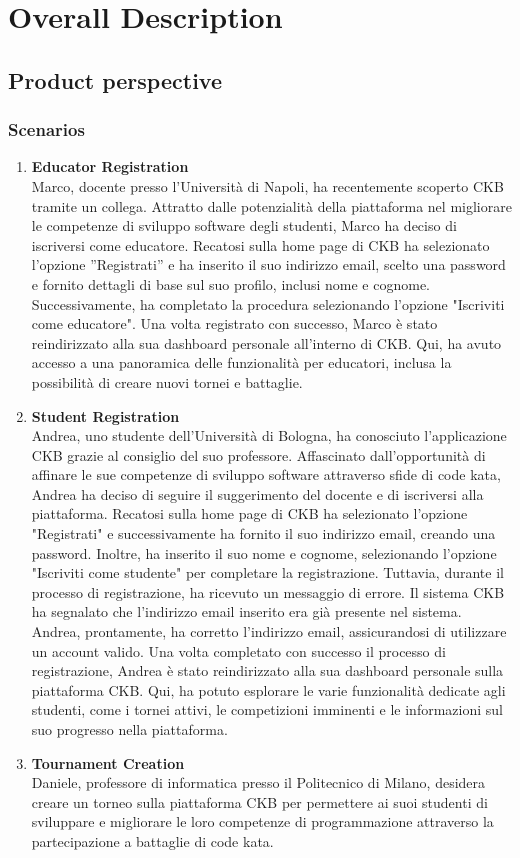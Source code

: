 \section{Overall Description}\label{intro}
\subsection{Product perspective}
\subsubsection{Scenarios}
\begin{enumerate}[label=\textbf{\Alph*}.]
    \item  \textbf{Educator Registration} \\
    Marco, docente presso l'Università di Napoli, ha recentemente scoperto CKB tramite un collega. Attratto dalle potenzialità della piattaforma nel migliorare le competenze di sviluppo software degli studenti, Marco ha deciso di iscriversi come educatore. Recatosi sulla home page di CKB ha selezionato l’opzione ”Registrati” e ha inserito il suo indirizzo email, scelto una password e fornito dettagli di base sul suo profilo, inclusi nome e cognome. Successivamente, ha completato la procedura selezionando l'opzione "Iscriviti come educatore". Una volta registrato con successo, Marco è stato reindirizzato alla sua dashboard personale all'interno di CKB. Qui, ha avuto accesso a una panoramica delle funzionalità per educatori, inclusa la possibilità di creare nuovi tornei e battaglie.
\item  \textbf{Student Registration} \\
Andrea, uno studente dell'Università di Bologna, ha conosciuto l'applicazione CKB grazie al consiglio del suo professore. Affascinato dall'opportunità di affinare le sue competenze di sviluppo software attraverso sfide di code kata, Andrea ha deciso di seguire il suggerimento del docente e di iscriversi alla piattaforma.
Recatosi sulla home page di CKB ha selezionato l'opzione "Registrati" e successivamente ha fornito il suo indirizzo email, creando una password. Inoltre, ha inserito il suo nome e cognome, selezionando l'opzione "Iscriviti come studente" per completare la registrazione. Tuttavia, durante il processo di registrazione, ha ricevuto un messaggio di errore. Il sistema CKB ha segnalato che l'indirizzo email inserito era già presente nel sistema. Andrea, prontamente, ha corretto l'indirizzo email, assicurandosi di utilizzare un account valido.
Una volta completato con successo il processo di registrazione, Andrea è stato reindirizzato alla sua dashboard personale sulla piattaforma CKB. Qui, ha potuto esplorare le varie funzionalità dedicate agli studenti, come i tornei attivi, le competizioni imminenti e le informazioni sul suo progresso nella piattaforma.
    \item \textbf{Tournament Creation} \\ 
    Daniele, professore di informatica presso il Politecnico di Milano, desidera creare un torneo sulla piattaforma CKB per permettere ai suoi studenti di sviluppare e migliorare le loro competenze di programmazione attraverso la partecipazione a battaglie di code kata.


\end{enumerate}
